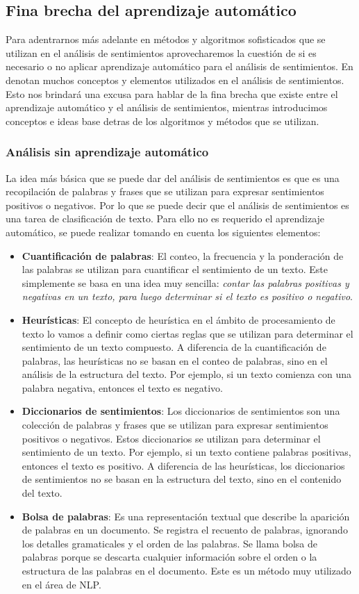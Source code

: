 \documentclass[12pt, conference]{IEEEtran}
\begin{document}
\subsection{Fina brecha del aprendizaje automático}
Para adentrarnos más adelante en métodos y algoritmos sofisticados que se utilizan en el análisis de sentimientos aprovecharemos la cuestión de si es necesario o no aplicar aprendizaje automático para el análisis de sentimientos. 
En \cite{b5} denotan muchos conceptos y elementos utilizados en el análisis de sentimientos. Esto nos brindará una excusa para hablar de la fina brecha que existe entre el aprendizaje automático y el análisis de sentimientos, mientras introducimos conceptos e ideas base detras de los algoritmos y métodos que se utilizan.

\subsubsection{Análisis sin aprendizaje automático}
La idea más básica que se puede dar del análisis de sentimientos es que es una recopilación de palabras y frases que se utilizan para expresar sentimientos positivos o negativos. Por lo que se puede decir que el análisis de sentimientos es una tarea de clasificación de texto. Para ello no es requerido el aprendizaje automático, se puede realizar tomando en cuenta los siguientes elementos:
\begin{itemize}
\item \textbf{Cuantificación de palabras}: El conteo, la frecuencia y la ponderación de las palabras se utilizan para cuantificar el sentimiento de un texto. Este simplemente se basa en una idea muy sencilla: \textit{contar las palabras positivas y negativas en un texto, para luego determinar si el texto es positivo o negativo}.
\item \textbf{Heurísticas}: El concepto de heurística en el ámbito de procesamiento de texto lo vamos a definir como ciertas reglas que se utilizan para determinar el sentimiento de un texto compuesto. 
A diferencia de la cuantificación de palabras, las heurísticas no se basan en el conteo de palabras, sino en el análisis de la estructura del texto. 
Por ejemplo, si un texto comienza con una palabra negativa, entonces el texto es negativo.
\item \textbf{Diccionarios de sentimientos}: Los diccionarios de sentimientos son una colección de palabras y frases que se utilizan para expresar sentimientos positivos o negativos. 
Estos diccionarios se utilizan para determinar el sentimiento de un texto. 
Por ejemplo, si un texto contiene palabras positivas, entonces el texto es positivo. 
A diferencia de las heurísticas, los diccionarios de sentimientos no se basan en la estructura del texto, sino en el contenido del texto.
\item \textbf{Bolsa de palabras}: Es una representación textual que describe la aparición de palabras en un documento. Se registra el recuento de palabras, ignorando los detalles gramaticales y el orden de las palabras. Se llama bolsa de palabras porque se descarta cualquier información sobre el orden o la estructura de las palabras en el documento. Este es un método muy utilizado en el área de NLP.
\end{itemize}
\end{document}
